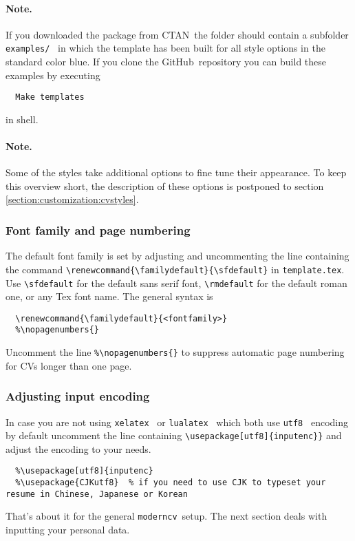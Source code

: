 \documentclass[a4paper,11pt]{article}
\newcommand{\code}[1]{\lstinline!#1!}
\newcommand{\Code}[1]{\lstinline!#1!~} %
\newcommand{\Moderncv}{\Code{moderncv}}
\newcommand{\Github}{GitHub~}
\newcommand{\Ctan}{CTAN~}
\newcommand{\cvtemplate}{\code{template.tex}}
\begin{document}
\paragraph{Note.} If you downloaded the package from \Ctan the folder should contain a subfolder 
\Code{examples/} in which the template has been built for all style options in the standard color blue. 
If you clone the \Github repository you can build these examples by executing 
\begin{lstlisting}
  Make templates
\end{lstlisting}
in shell.


\paragraph{Note.} Some of the styles take additional options to fine tune their appearance. To keep 
this overview short, the description of these options is postponed to section \ref{section:customization:cvstyles}.

\subsubsection*{Font family and page numbering}
The default font family is set by adjusting and uncommenting the line containing the command 
\lstinline!\renewcommand{\familydefault}{\sfdefault}! in \cvtemplate.
Use \lstinline!\sfdefault! for the default sans serif font, \lstinline!\rmdefault! for the default roman one, or any Tex font name. The general syntax is
\begin{lstlisting}
  \renewcommand{\familydefault}{<fontfamily>}
  %\nopagenumbers{}
\end{lstlisting}
 Uncomment the line \lstinline!%\nopagenumbers{}! to suppress automatic page numbering for CVs longer than one page.

\subsubsection*{Adjusting input encoding}
In case you are not using \Code{xelatex} or \Code{lualatex} which both use \Code{utf8} encoding by default uncomment the line containing \lstinline!\usepackage[utf8]{inputenc}}! and adjust the encoding to your needs. 
\begin{lstlisting}
  %\usepackage[utf8]{inputenc}
  %\usepackage{CJKutf8}  % if you need to use CJK to typeset your resume in Chinese, Japanese or Korean
\end{lstlisting}
That's about it for the general \Moderncv setup. 
The next section deals with inputting your personal data.
\end{document}
